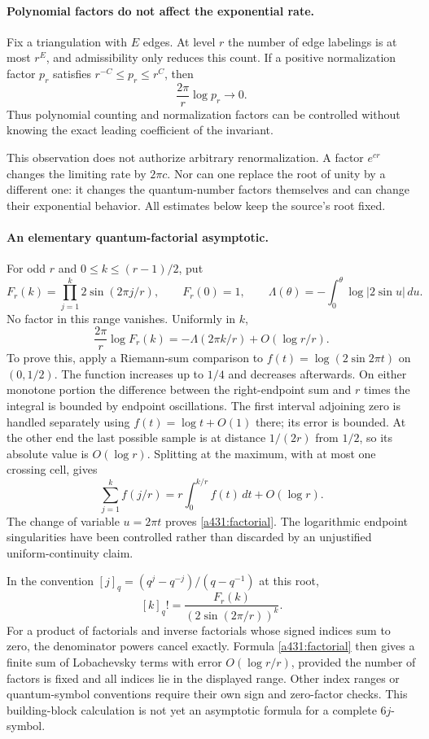 \documentclass[11pt]{article}
\begin{document}
\paragraph{Polynomial factors do not affect the exponential rate.}
Fix a triangulation with $E$ edges. At level $r$ the number of edge
labelings is at most $r^E$, and admissibility only reduces this count.
If a positive normalization factor $p_r$ satisfies
$r^{-C}\leq p_r\leq r^C$, then
\[
                       \frac{2\pi}{r}\log p_r\longrightarrow0.
\]
Thus polynomial counting and normalization factors can be controlled
without knowing the exact leading coefficient of the invariant.

This observation does not authorize arbitrary renormalization.
A factor $e^{cr}$ changes the limiting rate by $2\pi c$.
Nor can one replace the root of unity by a different one:
it changes the quantum-number factors themselves and can
change their exponential behavior. All estimates below keep
the source's root fixed.

\paragraph{An elementary quantum-factorial asymptotic.}
For odd $r$ and $0\leq k\leq(r-1)/2$, put
\[
 F_r(k)=\prod_{j=1}^k2\sin(2\pi j/r),\qquad F_r(0)=1,
 \qquad
 \Lambda(\theta)=-\int_0^\theta\log|2\sin u|\,du.
\]
No factor in this range vanishes. Uniformly in $k$,
\begin{equation}\label{a431:factorial}
 \frac{2\pi}{r}\log F_r(k)
                 =-\Lambda(2\pi k/r)+O(\log r/r).
\end{equation}
To prove this, apply a Riemann-sum comparison to
$f(t)=\log(2\sin 2\pi t)$ on $(0,1/2)$.
The function increases up to $1/4$ and decreases afterwards.
On either monotone portion the difference between the
right-endpoint sum and $r$ times the integral is bounded
by endpoint oscillations. The first interval adjoining
zero is handled separately using
$f(t)=\log t+O(1)$ there; its error is bounded.
At the other end the last possible sample is at
distance $1/(2r)$ from $1/2$, so its absolute
value is $O(\log r)$. Splitting at the maximum,
with at most one crossing cell, gives
\[
 \sum_{j=1}^kf(j/r)=r\int_0^{k/r}f(t)\,dt+O(\log r).
\]
The change of variable $u=2\pi t$ proves
\eqref{a431:factorial}. The logarithmic endpoint
singularities have been controlled rather than
discarded by an unjustified uniform-continuity claim.

In the convention
$[j]_q=(q^j-q^{-j})/(q-q^{-1})$ at this root,
\[
                  [k]_q!=
             \frac{F_r(k)}{(2\sin(2\pi/r))^k}.
\]
For a product of factorials and inverse factorials
whose signed indices sum to zero, the denominator
powers cancel exactly. Formula
\eqref{a431:factorial} then gives a finite sum
of Lobachevsky terms with error $O(\log r/r)$,
provided the number of factors is fixed and
all indices lie in the displayed range.
Other index ranges or quantum-symbol conventions
require their own sign and zero-factor checks.
This building-block calculation is not yet an
asymptotic formula for a complete $6j$-symbol.
\end{document}
